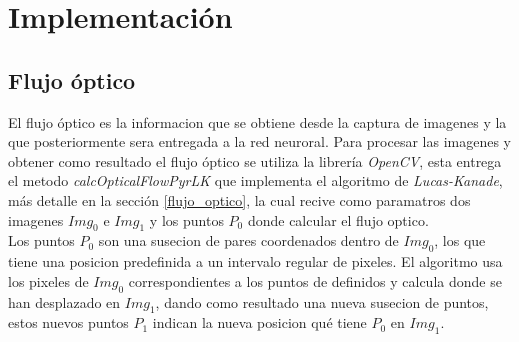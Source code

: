 \documentclass{iccmemoria}
\begin{document}
\begin{table}[H]
\caption{Paquete de datos del moviento del \emph{mouse}.}
\label{tab:ps/2 package}
\end{table}



\chapter{Implementación}

\section{Flujo óptico}

El flujo óptico es la informacion que se obtiene desde la captura de imagenes y la que posteriormente sera entregada a la red neuroral. Para procesar las imagenes y obtener como resultado el flujo óptico se utiliza la librería \emph{OpenCV}, esta entrega el metodo \emph{calcOpticalFlowPyrLK} que implementa el algoritmo de \emph{Lucas-Kanade}, más detalle en la sección \ref{flujo_optico}, la cual recive como paramatros dos imagenes $Img_0$ e $Img_1$ y los puntos $P_0$ donde calcular el flujo optico.\\

Los puntos $P_0$ son una susecion de pares coordenados dentro de $Img_0$, los que tiene una posicion predefinida a un intervalo regular de pixeles. El algoritmo usa los pixeles de $Img_0$ correspondientes a los puntos de definidos y calcula donde se han desplazado en $Img_1$, dando como resultado una nueva susecion de puntos, estos nuevos puntos $P_1$ indican la nueva posicion qué tiene $P_0$ en $Img_1$.\\
\end{document}
